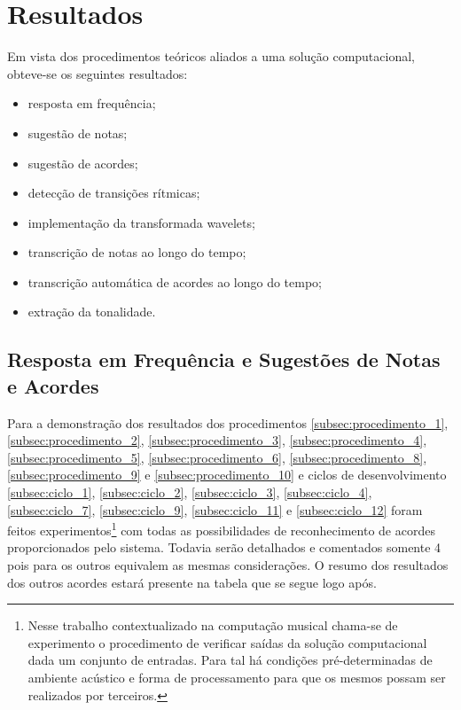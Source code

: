 \chapter{Resultados}
\label{chap:resultados}

Em vista dos procedimentos teóricos aliados a uma solução computacional, obteve-se os seguintes resultados:
\begin{itemize}
    \item resposta em frequência;
    \item sugestão de notas;
    \item sugestão de acordes;
    \item detecção de transições rítmicas;
    \item implementação da transformada wavelets;
    \item transcrição de notas ao longo do tempo;
    \item transcrição automática de acordes ao longo do tempo;
    \item extração da tonalidade.
\end{itemize}


\section{Resposta em Frequência e Sugestões de Notas e Acordes}

Para a demonstração dos resultados dos procedimentos \ref{subsec:procedimento_1}, \ref{subsec:procedimento_2}, \ref{subsec:procedimento_3}, \ref{subsec:procedimento_4}, \ref{subsec:procedimento_5}, \ref{subsec:procedimento_6}, \ref{subsec:procedimento_8}, \ref{subsec:procedimento_9} e \ref{subsec:procedimento_10} e ciclos de desenvolvimento \ref{subsec:ciclo_1}, \ref{subsec:ciclo_2}, \ref{subsec:ciclo_3}, \ref{subsec:ciclo_4}, \ref{subsec:ciclo_7}, \ref{subsec:ciclo_9}, \ref{subsec:ciclo_11} e \ref{subsec:ciclo_12} foram feitos experimentos\footnote{Nesse trabalho contextualizado na computação musical chama-se de experimento o procedimento de verificar saídas da solução computacional dada um conjunto de entradas. Para tal há condições pré-determinadas de ambiente acústico e forma de processamento para que os mesmos possam ser realizados por terceiros.} com todas as possibilidades de reconhecimento de acordes proporcionados pelo sistema. Todavia serão detalhados e comentados somente 4 pois para os outros equivalem as mesmas considerações. O resumo dos resultados dos outros acordes estará presente na tabela que se segue logo após.


